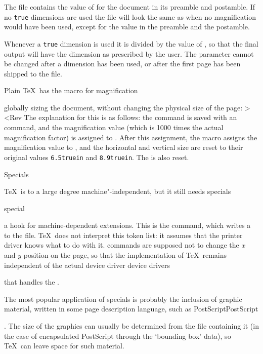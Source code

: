The  file contains the value of  for the
document in its preamble and postamble. 
If no {\tt true} dimensions are used
the  file will look the same as when no magnification
would have been used, except for the  value in the
preamble and the postamble.

Whenever a {\tt true} dimension is used it is divided
by the value of , so that the final output will have
the dimension as prescribed by the user.
The  parameter cannot be changed after a
 dimension has been used, or after the first
page has been shipped to the  file.

Plain \TeX\ has the  macro for
\csterm magnification\par
globally sizing the document, without changing
 the physical size of the page:
\Ver>
\def\magnification{\afterassignment\m@g\count@}
\def\m@g{\mag\count@
  \hsize6.5truein\vsize8.9truein\dimen\footins8truein}<Rev
The explanation for this is
as follows: the command  is saved with an 
command, and the magnification value (which is 1000 times the
actual magnification factor) is assigned to .
After this assignment, the macro  assigns
the magnification value to , and the horizontal
and vertical size are reset to 
their original values {\tt 6.5truein} and {\tt 8.9truein}.
The  is also reset.

\point[special] Specials

\TeX\ is to a large degree machine"-independent, but it still needs
\term specials\par\csterm special\par
a hook for machine-dependent extensions. This is the
 command, which writes a 
to the  file. \TeX\ does not interpret this token list:
it assumes that the printer driver knows what to do with it.
 commands are supposed not to change the
$x$ and $y$ position on the page, so that the implementation
of \TeX\ remains independent of the actual device driver
\term device drivers\par
that handles the .

The most popular application of specials is probably the
inclusion of graphic material, written in some
page description language, such as PostScript\term PostScript\par.
The size of the graphics can usually be determined from
the file containing it (in the case of encapsulated
PostScript through
the `bounding box' data), so \TeX\ can leave space for
such material.

